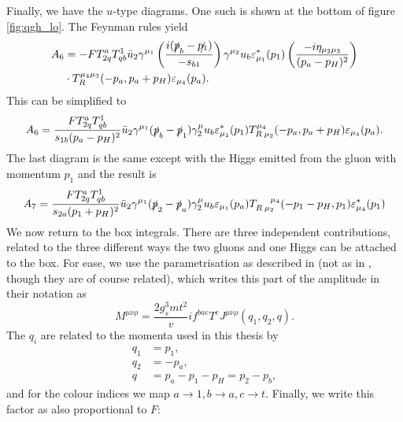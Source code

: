 Finally, we have the $u$-type diagrams. One such is shown at the bottom of figure \ref{fig:qgh_lo}. The Feynman rules yield
\begin{equation}
\begin{split}
A_6 &=-FT^a_{2q}T^1_{qb} \bar{u}_2 \gamma^{\mu_1}\left(\frac{i(\slashed{p}_b - \slashed{p_1})}{-s_{b1}} \right)\gamma^{\mu_2}u_b \varepsilon_{\mu_1}^*(p_1)\left(\frac{-i \eta_{\mu_2 \mu_3}}{(p_a-p_H)^2}\right)\\
& \cdot T_R^{\mu_4 \mu_3}(-p_a,p_a+p_H)\varepsilon_{\mu_4}(p_a).
\end{split}
\end{equation}
This can be simplified to
\begin{equation}
A_6 = \frac{F T^a_{2q}T^1_{qb}}{s_{1b}(p_a-p_H)^2} \bar{u}_2 \gamma^{\mu_1} (\slashed{p}_b - \slashed{p}_1) \gamma^\mu_2 u_b \varepsilon_{\mu_1}^*(p_1)T_{R \hspace{2pt} \mu_2}^{\mu_4}(-p_a,p_a+p_H)\varepsilon_{\mu_4}(p_a).
\end{equation}
The last diagram is the same except with the Higgs emitted from the gluon with momentum $p_1$ and the result is
\begin{equation}
A_7 = \frac{F T^a_{2q}T^1_{qb}}{s_{2a}(p_1+p_H)^2} \bar{u}_2 \gamma^{\mu_1} (\slashed{p}_2 - \slashed{p}_a) \gamma^\mu_2 u_b \varepsilon_{\mu_1}(p_a)T_{R \hspace{2pt} \mu_2}^{\hspace{12pt} \mu_4}(-p_1-p_H,p_1)\varepsilon^*_{\mu_4}(p_1)
\end{equation}
We now return to the box integrals. There are three independent contributions, related to the three different ways the two gluons and one Higgs can be attached to the box. For ease, we use the parametrisation as described in \cite{Duca2003} (not as in \cite{DelDuca2001}, though they are of course related), which writes this part of the amplitude in their notation as
\begin{equation}
M^{\mu \nu \rho} = \frac{2 g_s^3 mt^2}{v} i f^{bac}T^c J^{\mu \nu \rho}(q_1,q_2,q).
\end{equation}
The $q_i$ are related to the momenta used in this thesis by
\begin{subequations}
\begin{align}
q_1 &= p_1, \\
q_2 &= - p_a, \\
q &= p_a-p_1-p_H = p_2-p_b,
\end{align}
\end{subequations}
and for the colour indices we map $a \to 1, b \to a, c\to t$. Finally, we write this factor as also proportional to $F$:
